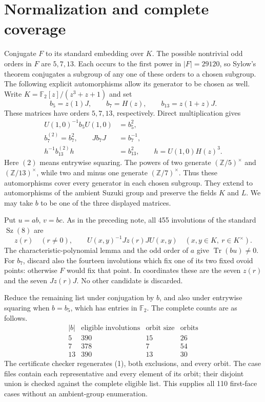 \documentclass[11pt,a4paper]{article}
\newcommand{\Sz}{\operatorname{Sz}}
\newcommand{\Tr}{\operatorname{Tr}}
\newcommand{\F}{\mathbb F}
\begin{document}
\section*{Normalization and complete coverage}

Conjugate $F$ to its standard embedding over $K$. The possible
nontrivial odd orders in $F$ are $5,7,13$. Each occurs to the first
power in $|F|=29120$, so Sylow's theorem conjugates a subgroup of
any one of these orders to a chosen subgroup. The following explicit
automorphisms allow its generator to be chosen as well. Write
$K=\F_2[z]/(z^3+z+1)$ and set
\[
 b_5=z(1)J,\qquad b_7=H(z),\qquad b_{13}=z(1+z)J.
\]
These matrices have orders $5,7,13$, respectively. Direct multiplication
gives
\begin{align*}
 U(1,0)^{-1}b_5U(1,0)&=b_5^2,\\
 b_7^{(2)}=b_7^2,\qquad Jb_7J&=b_7^{-1},\\
 h^{-1}b_{13}^{(2)}h&=b_{13}^2,
       \qquad h=U(1,0)H(z)^3.
\end{align*}
Here $(2)$ means entrywise squaring. The powers of two generate
$(\mathbb Z/5)^\times$ and $(\mathbb Z/13)^\times$, while two and
minus one generate $(\mathbb Z/7)^\times$. Thus these automorphisms
cover every generator in each chosen subgroup. They extend to
automorphisms of the ambient Suzuki group and preserve the fields
$K$ and $L$. We may take $b$ to be one of the three displayed matrices.

Put $u=ab$, $v=bc$. As in the preceding note, all 455 involutions
of the standard $\Sz(8)$ are
\[
 z(r)\quad(r\ne0),\qquad
 U(x,y)^{-1}Jz(r)JU(x,y)\quad(x,y\in K,\ r\in K^\times). \tag{1}
\]
The characteristic-polynomial lemma and the odd order of $a$ give
$\Tr(bu)\ne0$. For $b_7$, discard also the fourteen involutions
which fix one of its two fixed ovoid points: otherwise $F$ would
fix that point. In coordinates these are the seven $z(r)$ and the
seven $Jz(r)J$. No other candidate is discarded.

Reduce the remaining list under conjugation by $b$, and also under
entrywise squaring when $b=b_5$, which has entries in $\F_2$.
The complete counts are as follows.
\[
\begin{array}{c|r|r|r}
 |b|&\text{eligible involutions}&\text{orbit size}&\text{orbits}\\\hline
 5&390&15&26\\
 7&378&7&54\\
 13&390&13&30
\end{array}                                                     \tag{2}
\]
The certificate checker regenerates (1), both exclusions, and every
orbit. The case files contain each representative and every element
of its orbit; their disjoint union is checked against the complete
eligible list. This supplies all 110 first-face cases without an
ambient-group enumeration.
\end{document}
